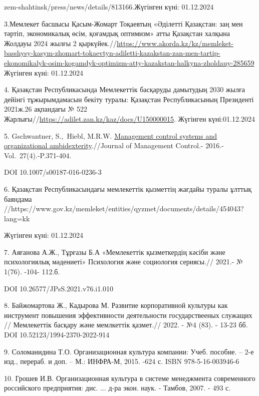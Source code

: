 zem-shahtinsk/press/news/details/813166.Жүгінген күні: 01.12.2024

3.Мемлекет басшысы Қасым-Жомарт Тоқаевтың «Әділетті Қазақстан: заң мен
тәртіп, экономикалық өсім, қоғамдық оптимизм» атты Қазақстан халқына
Жолдауы 2024 жылғы 2
қыркүйек.//\url{https://www.akorda.kz/kz/memleket-basshysy-kasym-zhomart-tokaevtyn-adiletti-kazakstan-zan-men-tartip-ekonomikalyk-osim-kogamdyk-optimizm-atty-kazakstan-halkyna-zholdauy-285659}
Жүгінген күні: 01.12.2024

4. Қазақстан Республикасында Мемлекеттік басқаруды дамытудың 2030 жылға
дейінгі тұжырымдамасын бекіту туралы: Қазақстан Республикасының
Президенті 2021ж.26 ақпандағы № 522
Жарлығы//\url{https://adilet.zan.kz/kaz/docs/U150000015}. Жүгінген
күні:01.12.2024

5. Gschwantner, S.,~Hiebl, M.R.W.
\href{https://www.scopus.com/record/display.uri?eid=2-s2.0-84978811157&origin=reflist&sort=plf-f&src=s&sid=9294c12779ee47479a1a0997e8991897&sot=b&sdt=b&sl=99&s=TITLE\%28An+Examination+of+Civil+Servants\%e2\%80\%99+Assessment+of++the+New+Civil+Service+Reforms+in+Kazakhstan\%29}{Management
control systems and organizational ambidexterity}.//Journal of
Management Control.- 2016.- Vol.~27(4).-P.371-404.~

DOI 10.1007/s00187-016-0236-3

6. Қазақстан Республикасындағы мемлекеттік қызметтің жағдайы туралы
ұлттық баяндама
//https://www.gov.kz/memleket/entities/qyzmet/documents/details/454043?lang=kk

Жүгінген күні: 01.12.2024

7. Аяғанова А.Ж., Тұрғазы Б.А «Мемлекеттік қызметкердің кәсіби және
психологиялық мәдениеті» Психология және социология сериясы.// 2021.- №
1(76). -104- 112.б.

DOI 10.26577/JPsS.2021.v76.i1.010

8. Байжомартова Ж., Кадырова М. Развитие корпоративной культуры как
инструмент повышения эффективности деятельности государствееных служащих
// Мемлекеттік басқару және мемлкеттік қазмет.// 2022. - №4 (83). -
13-23 бб. DOI 10.52123/1994-2370-2022-914

9. Соломанидина Т.О. Организационная культура компании: Учеб. пособие.
-- 2-е изд., перераб. и доп. -- М.: ИНФРА-М, 2015. -624 с. ISBN
978-5-16-003946-6

10. Грошев И.В. Организационная культура в системе менеджмента
современного российского предприятия: дис. ... д-ра экон. наук. -
Тамбов, 2007. - 493 с.

